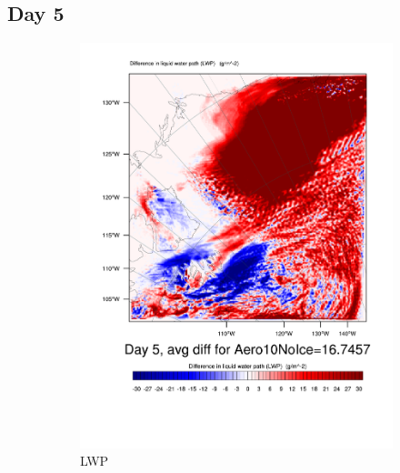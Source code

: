 \subsection{Day 5}
\begin{figure}[hb]
\centering
	\begin{subfigure}{0.48\textwidth}
		\centering
		\includegraphics[width=\textwidth]{results/aero10ni/Diff_LWP_Day5Aero10NoIce.pdf}
		\caption{LWP}
		\label{subfig:LWPr4Day5}
	\end{subfigure}
	\quad
	\begin{subfigure}{0.48\textwidth}
		\centering

\end{subfigure}
\end{figure}
